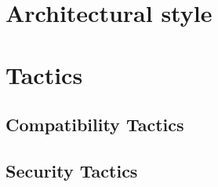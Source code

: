 \section{Architectural style}

\section{Tactics}

\subsection{Compatibility Tactics}

\subsection{Security Tactics}

